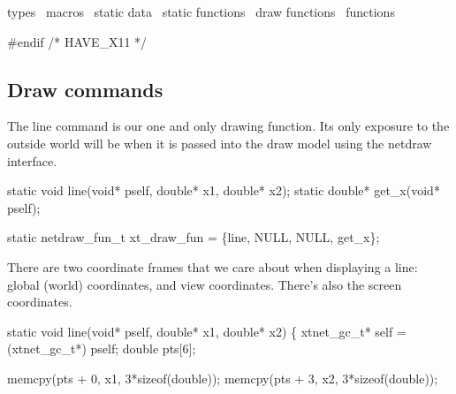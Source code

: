 \LA{}types~{\nwtagstyle{}}\RA{}
\LA{}macros~{\nwtagstyle{}}\RA{}
\LA{}static data~{\nwtagstyle{}}\RA{}
\LA{}static functions~{\nwtagstyle{}}\RA{}
\LA{}draw functions~{\nwtagstyle{}}\RA{}
\LA{}functions~{\nwtagstyle{}}\RA{}

#endif /* HAVE_X11 */
\nwendcode{}\nwdocspar


\subsection{Draw commands}

The {\Tt{}line\nwendquote} command is our one and only drawing function.  Its only
exposure to the outside world will be when it is passed into the
{\Tt{}draw\nwendquote} model using the {\Tt{}netdraw\nwendquote} interface.

\nwenddocs{}\endmoddef\nwstartdeflinemarkup{}\nwenddeflinemarkup
static void line(void* pself, double* x1, double* x2);
static double* get_x(void* pself);

static netdraw_fun_t xt_draw_fun = \{line, NULL, NULL, get_x\};

\nwendcode{}\nwdocspar

There are two coordinate frames that we care about when displaying
a line: global (world) coordinates, and view coordinates.
There's also the screen coordinates. %

\nwenddocs{}\endmoddef\nwstartdeflinemarkup{}\nwenddeflinemarkup
static void line(void* pself, double* x1, double* x2)
\{
    xtnet_gc_t* self = (xtnet_gc_t*) pself;
    double pts[6];

    memcpy(pts + 0, x1, 3*sizeof(double));
    memcpy(pts + 3, x2, 3*sizeof(double));

